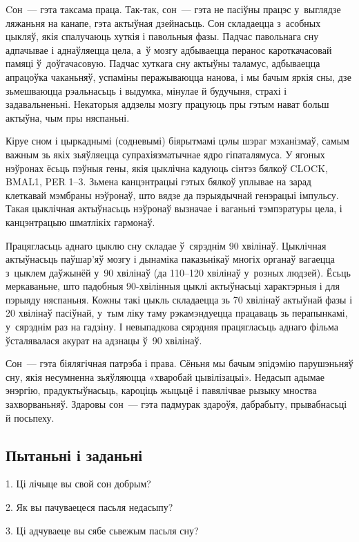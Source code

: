 Cон~--- гэта таксама праца. Так-так, сон~--- гэта не пасіўны працэс у~выглядзе ляжаньня на канапе, гэта актыўная дзейнасьць. Сон складаецца з~асобных цыкляў, якія спалучаюць хуткія і павольныя фазы. Падчас павольнага сну адпачывае і аднаўляецца цела, а~ў мозгу адбываецца перанос кароткачасовай памяці ў~доўгачасовую. Падчас хуткага сну актыўны таламус, адбываецца апрацоўка чаканьняў, успаміны перажываюцца нанова, і мы бачым яркія сны, дзе зьмешваюцца рэальнасьць і выдумка, мінулае й будучыня, страхі і задавальненьні. Некаторыя аддзелы мозгу працуюць пры гэтым нават больш актыўна, чым пры няспаньні.

Кіруе сном і цыркаднымі (содневымі) біярытмамі цэлы шэраг мэханізмаў, самым важным зь якіх зьяўляецца супрахіязматычнае ядро гіпаталямуса. У ягоных нэўронах ёсьць пэўныя гены, якія цыклічна кадуюць сінтэз бялкоў CLOCK, BMAL1, PER 1--3. Зьмена канцэнтрацыі гэтых бялкоў уплывае на зарад клеткавай мэмбраны нэўронаў, што вядзе да пэрыядычнай генэрацыі імпульсу. Такая цыклічная актыўнасьць нэўронаў вызначае і ваганьні тэмпэратуры цела, і канцэнтрацыю шматлікіх гармонаў.

Працягласьць аднаго цыклю сну складае ў~сярэднім 90 хвілінаў. Цыклічная актыўнасьць паўшар'яў мозгу і дынаміка паказьнікаў многіх органаў вагаецца з~цыклем даўжынёй у~90 хвілінаў (да 110--120 хвілінаў у~розных людзей). Ёсьць меркаваньне, што падобныя 90-хвілінныя цыклі актыўнасьці характэрныя і для пэрыяду няспаньня. Кожны такі цыкль складаецца зь 70 хвілінаў актыўнай фазы і 20 хвілінаў пасіўнай, у~тым ліку таму рэкамэндуецца працаваць зь перапынкамі, у~сярэднім раз на гадзіну. І невыпадкова сярэдняя працягласьць аднаго фільма ўсталявалася акурат на адзнацы ў~90 хвілінаў.

Сон~--- гэта біялягічная патрэба і права. Сёньня мы бачым эпідэмію парушэньняў сну, якія несумненна зьяўляюцца «хваробай цывілізацыі». Недасып адымае энэргію, прадуктыўнасьць, кароціць жыцьцё і павялічвае рызыку мноства захворваньняў. Здаровы сон~--- гэта падмурак здароўя, дабрабыту, прывабнасьці й посьпеху.

\subsection*{Пытаньні і заданьні}

1. Ці лічыце вы свой сон добрым?

2. Як вы пачуваецеся пасьля недасыпу?

3. Ці адчуваеце вы сябе сьвежым пасьля сну?



